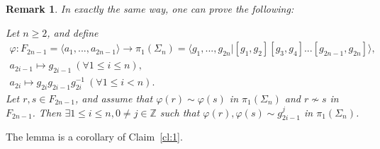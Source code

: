 \documentclass[11pt]{article}
\newenvironment{myequation}
    {
        \begin{equation*}
        \begin{gathered}
    }
    { 
        \end{gathered} 
        \end{equation*}
    }
\newtheorem*{remark}{Remark}
\newcommand{\Z}{\mathbb{Z}}
\begin{document}
    \begin{remark}
    In exactly the same way, one can prove the following:
    
    Let $n \geq 2$, and define
    \begin{myequation}
        \varphi: F_{2n-1} = \langle a_1,...,a_{2n-1} \rangle \to \pi_1(\Sigma_n) = \langle g_1,...,g_{2n} | [g_1,g_2][g_3,g_4]...[g_{2n-1},g_{2n}] \rangle ,\\
        a_{2i-1} \mapsto g_{2i-1} \ (\forall 1 \leq i \leq n) ,\\
        a_{2i} \mapsto g_{2i} g_{2i-1} g_{2i}^{-1} \ (\forall 1 \leq i < n) .
    \end{myequation}
    Let $r,s \in F_{2n-1}$, and assume that $\varphi(r) \sim \varphi(s)$ in $\pi_1(\Sigma_n)$ and $r \not\sim s$ in $F_{2n-1}$. Then $\exists 1 \leq i \leq n, 0 \neq j \in \Z$ such that $\varphi(r),\varphi(s) \sim g_{2i-1}^j$ in $\pi_1(\Sigma_n)$. \\
    \end{remark}
    
    The lemma is a corollary of Claim~\ref{cl:1}.
    
\end{document}
